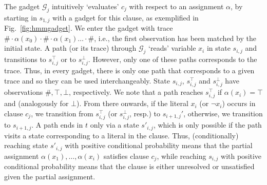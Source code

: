 \documentclass[runningheads]{llncs}
\begin{document}
The gadget $\mathcal{G}_j$ intuitively `evaluates' $c_j$ with respect to an assignment $\alpha$, by starting in $s_{1,j}$ with a gadget for this clause, as exemplified in Fig.~\ref{fig:hmmgadget}.  We enter the gadget with trace $\# \cdot \alpha(x_0) \cdot \# \cdot \alpha(x_1) \dots \cdot \#$, i.e., the first observation has been matched by the initial state.
A path (or its trace) through $\mathcal{G}_j$ `reads' variable $x_i$ in state $s_{i,j}$ and transitions to $s_{i,j}^\top$ or to $s_{i,j}^\bot$. However, only one of these paths corresponds to the trace. Thus, in every gadget, there is only one path that corresponds to a given trace and so they can be used interchangeably.
State $s_{i,j}$, $s_{i,j}^\top$ and $s_{i,j}^\bot$ have observations $\#, \top, \bot$, respectively. We note that a path  reaches $s_{i,j}^\top$ if $\alpha(x_i) = \top$ and (analogously for $\bot$).
From there onwards,  if the literal $x_i$ (or $\neg x_i$) occurs in clause $c_j$, we transition from $s_{i,j}^\top$ (or $s_{i,j}^\bot$, resp.) to $s_{i+1,j}'$, otherwise, we transition to $s_{i+1,j}$. A path ends in $t$ only via a state $s'_{i,j}$, which is only possible if the path visits a state corresponding to a literal in the clause. Thus, (conditionally) reaching state $s'_{i,j}$ with positive conditional probability means that the partial assignment $\alpha(x_1),\dots,\alpha(x_i)$ satisfies clause $c_j$, while reaching $s_{i,j}$ with positive conditional probability means that the clause is either unresolved or unsatisfied given the partial assignment.
\end{document}
